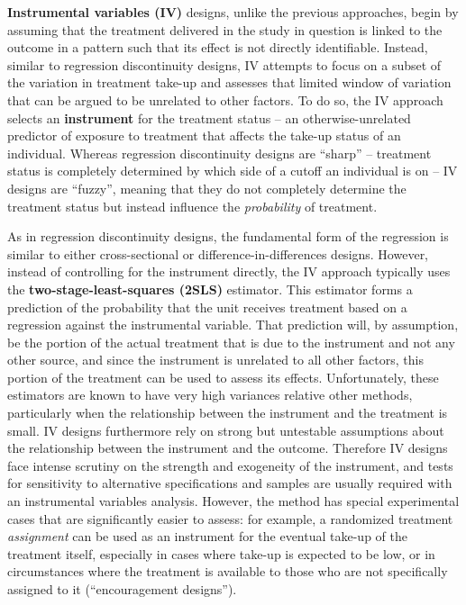 \textbf{Instrumental variables (IV)} designs, unlike the previous approaches,
begin by assuming that the treatment delivered in the study in question is
linked to the outcome in a pattern such that its effect is not directly identifiable.
Instead, similar to regression discontinuity designs,
IV attempts to focus on a subset of the variation in treatment take-up
and assesses that limited window of variation that can be argued
to be unrelated to other factors.\cite{angrist2001instrumental}
To do so, the IV approach selects an \textbf{instrument}
for the treatment status -- an otherwise-unrelated predictor of exposure to treatment
that affects the take-up status of an individual.
Whereas regression discontinuity designs are ``sharp'' --
treatment status is completely determined by which side of a cutoff an individual is on --
IV designs are ``fuzzy'', meaning that they do not completely determine
the treatment status but instead influence the \textit{probability} of treatment.

As in regression discontinuity designs,
the fundamental form of the regression
is similar to either cross-sectional or difference-in-differences designs.
However, instead of controlling for the instrument directly,
the IV approach typically uses the \textbf{two-stage-least-squares (2SLS)} estimator.\cite{bond2020}
This estimator forms a prediction of the probability that the unit receives treatment
based on a regression against the instrumental variable.
That prediction will, by assumption, be the portion of the actual treatment
that is due to the instrument and not any other source,
and since the instrument is unrelated to all other factors,
this portion of the treatment can be used to assess its effects.
Unfortunately, these estimators are known
to have very high variances relative other methods,
particularly when the relationship between the instrument and the treatment is small.\cite{young2017consistency}
IV designs furthermore rely on strong but untestable assumptions
about the relationship between the instrument and the outcome.\cite{bound1995problems}
Therefore IV designs face intense scrutiny on the strength and exogeneity of the instrument,
and tests for sensitivity to alternative specifications and samples
are usually required with an instrumental variables analysis.
However, the method has special experimental cases that are significantly easier to assess:
for example, a randomized treatment \textit{assignment} can be used as an instrument
for the eventual take-up of the treatment itself,
especially in cases where take-up is expected to be low,
or in circumstances where the treatment is available
to those who are not specifically assigned to it (``encouragement designs'').

